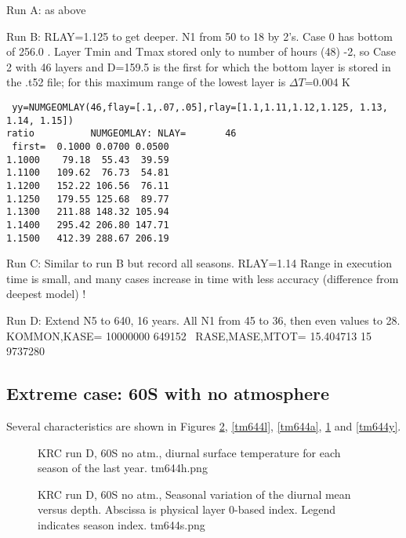 \documentclass{article}
\begin{document}
Run A: as above

Run B:  RLAY=1.125 to get deeper. N1 from 50 to 18 by 2's. Case 0 has bottom of  256.0 . Layer Tmin and Tmax stored only to number of hours (48) -2, so Case 2 with 46 layers and D=159.5 is the first for which the bottom layer is stored in the .t52 file; for this maximum range of the lowest layer is $\Delta T$=0.004 K
\vspace{-3.mm} 
\begin{verbatim}
 yy=NUMGEOMLAY(46,flay=[.1,.07,.05],rlay=[1.1,1.11,1.12,1.125, 1.13, 1.14, 1.15]) 
ratio          NUMGEOMLAY: NLAY=       46
 first=  0.1000 0.0700 0.0500
1.1000    79.18  55.43  39.59
1.1100   109.62  76.73  54.81
1.1200   152.22 106.56  76.11
1.1250   179.55 125.68  89.77
1.1300   211.88 148.32 105.94
1.1400   295.42 206.80 147.71
1.1500   412.39 288.67 206.19
\end{verbatim} 

Run C: Similar to run B but record all seasons. RLAY=1.14  Range in execution time is small, and many cases increase in time with less accuracy (difference from deepest model) !

Run D: Extend N5 to 640, 16 years. All N1 from 45 to 36, then even values to 28.
\\  KOMMON,KASE=  10000000  649152  \ RASE,MASE,MTOT=   15.404713    15     9737280


\subsection{Extreme case: 60\qd S with no atmosphere}

 Several characteristics are shown in Figures  \ref{tm644s}, \ref{tm644l}, \ref{tm644a}, \ref{tm644h} and \ref{tm644y}.

\begin{figure}[!ht] 
\caption[60S no atm., diurnal surface temperature]{KRC run D, 60S no atm.,
  diurnal surface temperature for each season of the last year.
\label{tm644h}  tm644h.png }
\end{figure} 

\begin{figure}[!ht] 
\caption[60S no atm., Seasonal T vers depth ]{KRC run D, 60S no atm., Seasonal
  variation of the diurnal mean versus depth. Abscissa is physical layer 0-based
  index. Legend indicates season index.
\label{tm644s} tm644s.png  }
\end{figure} 
\end{document}
